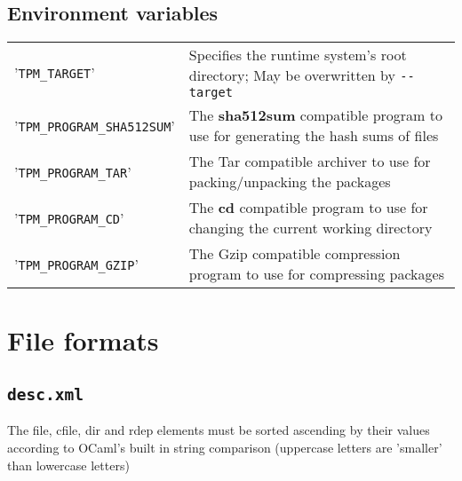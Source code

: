 \documentclass[a4paper]{article}
\newcommand{\file}[1]{\texttt{#1}}
\newcommand{\program}[1]{\textbf{#1}}
\newcommand{\variable}[1]{'\texttt{#1}'}
\begin{document}
	\subsection{Environment variables}
	\label{sec:environment_variables}
	
	\bgroup
	\def\arraystretch{1.5}
	\begin{tabularx}{\textwidth}{lX}
		\variable{TPM\_TARGET} & Specifies the runtime system's root directory; May be overwritten by \texttt{-{}-target} \\
		
		\variable{TPM\_PROGRAM\_SHA512SUM} & The \program{sha512sum} compatible program to use for generating the hash sums of files \\
		
		\variable{TPM\_PROGRAM\_TAR} & The Tar compatible archiver to use for packing/unpacking the packages \\
		
		\variable{TPM\_PROGRAM\_CD} & The \program{cd} compatible program to use for changing the current working directory \\
		
		\variable{TPM\_PROGRAM\_GZIP} & The Gzip compatible compression program to use for compressing packages \\
	\end{tabularx}
	\egroup
	
	\section{File formats}
	\label{sec:file_formats}
	
	\subsection{\file{desc.xml}}
	\label{sec:desc.xml}
	

	\vspace{1em}
	The file, cfile, dir and rdep elements must be sorted ascending by their values according to OCaml's built in string comparison (uppercase letters are 'smaller' than lowercase letters)
	
\end{document}
